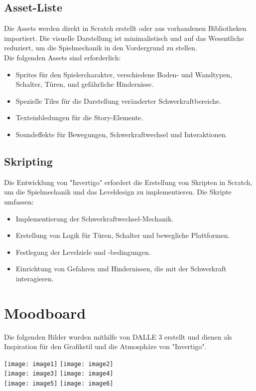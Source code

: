 \documentclass{article}
\begin{document}
\subsection{Asset-Liste}
Die Assets werden direkt in Scratch erstellt oder aus vorhandenen Bibliotheken importiert.
Die visuelle Darstellung ist minimalistisch und auf das Wesentliche reduziert, um die Spielmechanik in den Vordergrund zu stellen.
\\
Die folgenden Assets sind erforderlich:
\begin{itemize}
    \item Sprites für den Spielercharakter, verschiedene Boden- und Wandtypen, Schalter, Türen, und gefährliche Hindernisse.
    \item Spezielle Tiles für die Darstellung veränderter Schwerkraftbereiche.
    \item Texteinbledungen für die Story-Elemente.
    \item Soundeffekte für Bewegungen, Schwerkraftwechsel und Interaktionen.
\end{itemize}

\subsection{Skripting}
Die Entwicklung von "Invertigo" erfordert die Erstellung von Skripten in Scratch, um die Spielmechanik und das Leveldesign zu implementieren.
Die Skripte umfassen:
\begin{itemize}
    \item Implementierung der Schwerkraftwechsel-Mechanik.
    \item Erstellung von Logik für Türen, Schalter und bewegliche Plattformen.
    \item Festlegung der Levelziele und -bedingungen.
    \item Einrichtung von Gefahren und Hindernissen, die mit der Schwerkraft interagieren.
\end{itemize}

\section{Moodboard}

Die folgenden Bilder wurden mithilfe von DALLE 3 erstellt und dienen als Inspiration für den Grafikstil und die Atmosphäre von "Invertigo".

\texttt{[image: image1]}
\texttt{[image: image2]}
\\
\texttt{[image: image3]}
\texttt{[image: image4]}
\\
\texttt{[image: image5]}
\texttt{[image: image6]}
\end{document}
